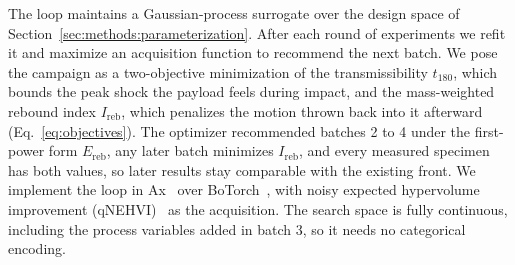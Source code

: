 \documentclass[lineno,nocopyright,upint,varvw,hyphenate]{asmejour}
\begin{document}
The loop maintains a Gaussian-process surrogate over the design space of
Section~\ref{sec:methods:parameterization}. After each round of
experiments we refit it and maximize an acquisition function to
recommend the next batch. We pose the campaign as a two-objective
minimization of the transmissibility $t_{180}$, which bounds the peak
shock the payload feels during impact, and the mass-weighted rebound
index $I_{\mathrm{reb}}$, which penalizes the motion thrown back into it
afterward (Eq.~\eqref{eq:objectives}). The optimizer recommended batches
2 to 4 under the first-power form $E_{\mathrm{reb}}$, any later batch
minimizes $I_{\mathrm{reb}}$, and every measured specimen has both
values, so later results stay comparable with the existing front. We
implement the loop in Ax~\citep{pmlr-v293-olson25a} over
BoTorch~\citep{balandat2020botorch}, with noisy expected hypervolume
improvement (qNEHVI)~\citep{daulton2021nehvi} as the acquisition. The
search space is fully continuous, including the process variables added
in batch 3, so it needs no categorical encoding.
\end{document}
